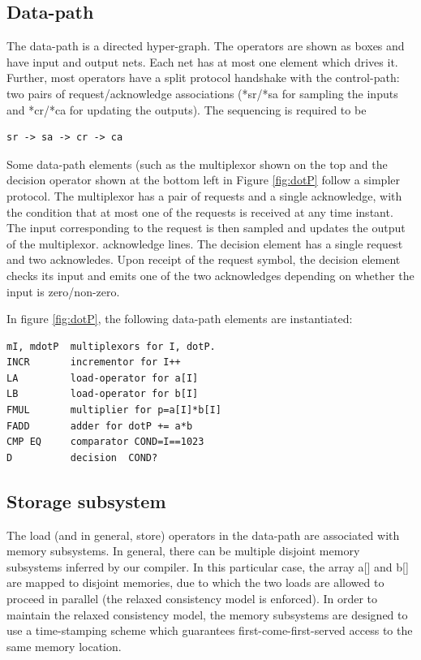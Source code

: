 \documentclass[conference]{IEEEtran}
\begin{document}
\subsection{Data-path}
The data-path is a directed hyper-graph.  The operators
are shown as boxes and have input and output nets.  Each
net has at most one element which drives it.  Further, most
operators have  a split protocol handshake with
the control-path:  two pairs of request/acknowledge 
associations (*sr/*sa for sampling the inputs  and *cr/*ca for
updating the outputs).    The sequencing is required to be
\begin{verbatim}
sr -> sa -> cr -> ca
\end{verbatim}

Some data-path elements (such as the multiplexor
shown on the top and the decision operator shown at the bottom
left in Figure \ref{fig:dotP} follow a simpler protocol.  The multiplexor
has a pair of requests and a single acknowledge, with the condition
that at most one of the requests is received at any time instant.
The input corresponding to the request is then sampled and updates
the output of the multiplexor.
acknowledge lines.
The decision element has a single request and two acknowledes.  Upon
receipt of the request symbol, the decision element checks its input
and emits one of the two acknowledges depending on whether the input
is zero/non-zero.

In figure \ref{fig:dotP}, the following data-path elements
are instantiated:
\begin{verbatim}
mI, mdotP  multiplexors for I, dotP.
INCR       incrementor for I++
LA         load-operator for a[I]
LB         load-operator for b[I]
FMUL       multiplier for p=a[I]*b[I]
FADD       adder for dotP += a*b
CMP EQ     comparator COND=I==1023
D          decision  COND?
\end{verbatim}


\subsection{Storage subsystem}

The load (and in general, store) operators in the data-path
are associated with memory subsystems.  In general, there
can be multiple disjoint memory subsystems inferred by our
compiler.  In this particular case, the array a[] and b[] 
are mapped to disjoint memories, due to which the two
loads are allowed to proceed in parallel (the relaxed consistency
model is enforced).
In order to maintain the relaxed consistency model, the
memory subsystems are designed to use a time-stamping 
scheme which guarantees first-come-first-served access to
the same memory location.
\end{document}
